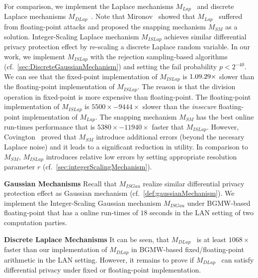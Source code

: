 For comparison, we implement the  Laplace mechanisms $M_{Lap}$~\cite{eigner2014differentially} and discrete Laplace mechanisms $M_{DLap}$~\cite{eigner2014differentially}.
Note that Mironov~\cite{mironov2014differentially} showed that $M_{Lap}$~\cite{eigner2014differentially} suffered from floating-point attacks and proposed the snapping mechanism $M_{SM}$ as a solution.
Integer-Scaling Laplace mechanism $M_{ISLap} $ achieves similar differential privacy protection effect by re-scaling a discrete Laplace random variable. In our work, we implement $M_{ISLap} $ with the rejection sampling-based algorithms (cf.~\autoref{sec:DiscreteGaussianMechanism}) and setting the fail probability $p<2^{-40}$.
We can see that the fixed-point implementation of $M_{ISLap}$ is $1.09\time-1.29\times$ slower than the floating-point implementation of $M_{ISLap}$.
The reason is that the division operation in fixed-point is more expensive than floating-point.
The floating-point implementation of $M_{ISLap}$ is $5500\times-9444\times$ slower than the \textit{insecure} floating-point implementation of $M_{Lap}$.
The snapping mechanism $M_{SM}$ has the best online run-times performance that is $5380\times-11940\times $ faster that $M_{ISLap}$.
However, Covington~\cite{Covington2019} proved that $M_{SM}$ introduce additional errors (beyond the necesary Laplace noise) and it leads to a significant reduction in utility.
In comparison to $M_{SM}$, $M_{ISLap}$ introduces relative low errors by setting appropriate resolution parameter $r$ (cf.~\autoref{sec:integerScalingMechanism}).

\textbf{Gaussian Mechanisms}
Recall that $M_{ISGau}$ realize similar differential privacy protection effect as Gaussian mechanism (cf.~\autoref{def:gaussianMechanism}).
We implement the Integer-Scaling Gaussian mechanism $M_{ISGau}$ under BGMW-based floating-point that has a online run-times of $18$ seconds in the LAN setting of two computation parties.

\textbf{Discrete Laplace Mechanisms}
It can be seen, that $M_{DLap}$~\cite{eigner2014differentially} is at least $1068\times$ faster than our implementation of $M_{DLap}$ in BGMW-based fixed/floating-point arithmetic in the LAN setting. However, it remains to prove if $M_{DLap}$~\cite{eigner2014differentially} can satisfy differential privacy under fixed or floating-point implementation.




